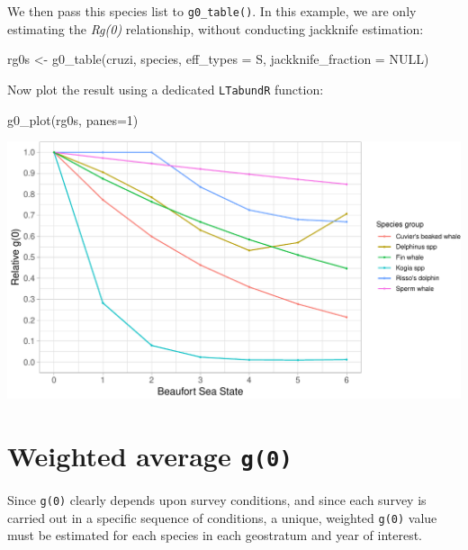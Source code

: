 \documentclass[
]{book}
\newenvironment{Shaded}{\begin{snugshade}}{\end{snugshade}}
\newcommand{\AttributeTok}[1]{\textcolor[rgb]{0.77,0.63,0.00}{#1}}
\newcommand{\ConstantTok}[1]{\textcolor[rgb]{0.00,0.00,0.00}{#1}}
\newcommand{\DecValTok}[1]{\textcolor[rgb]{0.00,0.00,0.81}{#1}}
\newcommand{\FunctionTok}[1]{\textcolor[rgb]{0.00,0.00,0.00}{#1}}
\newcommand{\NormalTok}[1]{#1}
\newcommand{\OtherTok}[1]{\textcolor[rgb]{0.56,0.35,0.01}{#1}}
\newcommand{\StringTok}[1]{\textcolor[rgb]{0.31,0.60,0.02}{#1}}
\begin{document}
We then pass this species list to \texttt{g0\_table()}. In this example, we are only estimating the \emph{Rg(0)} relationship, without conducting jackknife estimation:

\begin{Shaded}
\begin{Highlighting}[]
\NormalTok{rg0s }\OtherTok{\textless{}{-}} \FunctionTok{g0\_table}\NormalTok{(cruzi,}
\NormalTok{               species,}
               \AttributeTok{eff\_types =} \StringTok{\textquotesingle{}S\textquotesingle{}}\NormalTok{,}
               \AttributeTok{jackknife\_fraction =} \ConstantTok{NULL}\NormalTok{)}
\end{Highlighting}
\end{Shaded}

Now plot the result using a dedicated \texttt{LTabundR} function:

\begin{Shaded}
\begin{Highlighting}[]
\FunctionTok{g0\_plot}\NormalTok{(rg0s, }\AttributeTok{panes=}\DecValTok{1}\NormalTok{)}
\end{Highlighting}
\end{Shaded}

\includegraphics{figures/unnamed-chunk-211-1.pdf}

\hypertarget{weighted-average-g0}{%
\section*{\texorpdfstring{Weighted average \texttt{g(0)}}{Weighted average g(0)}}\label{weighted-average-g0}}

Since \texttt{g(0)} clearly depends upon survey conditions, and since each survey is carried out in a specific sequence of conditions, a unique, weighted \texttt{g(0)} value must be estimated for each species in each geostratum and year of interest.
\end{document}
